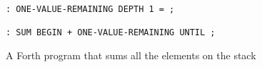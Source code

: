 \begin{figure}[!htb]
    \centering
    \begin{lstlisting}
: ONE-VALUE-REMAINING DEPTH 1 = ;

: SUM BEGIN + ONE-VALUE-REMAINING UNTIL ;
\end{lstlisting}
    \caption{A Forth program that sums all the elements on the stack}
    \label{fig:forth_example}
\end{figure}
